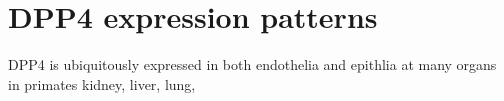\section{DPP4 expression patterns}
DPP4 is ubiquitously expressed in both endothelia and epithlia at many organs in primates kidney, liver, lung, 